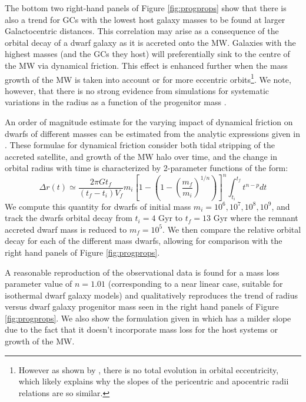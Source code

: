 \documentclass[useAMS,usenatbib]{mn2e}
\begin{document}
The bottom two right-hand panels of Figure \ref{fig:progprops}
show that there is also a
trend for GCs with the lowest host galaxy masses to be found at larger
Galactocentric distances.  This correlation may arise as a consequence of the
orbital decay of a dwarf galaxy as it is accreted onto the MW.  
Galaxies with the highest masses (and the GCs they host) will preferentially
sink to the centre of the MW via dynamical friction.  This effect is enhanced
further when the mass growth of the MW is taken into account or for more
eccentric orbits\footnote{However as shown by \cite{vandenbosch99}, there is no
total evolution in orbital eccentricity, which likely explains why the slopes
of the pericentric and apocentric radii relations are so similar.}.  We note,
however, that there is no strong evidence from simulations for systematic
variations in the radius as a function of the progenitor mass \citep{Wang11}.

An order of magnitude estimate for the varying impact of dynamical friction
on dwarfs of different masses can be estimated from the analytic expressions
given in \cite{Zhao04}.  These formulae for dynamical friction consider both
tidal stripping of the accreted satellite, and growth of the MW halo over time,
and the change in orbital radius with time is characterized by 2-parameter 
functions of the form:
\begin{equation}
\Delta r(t) \simeq \frac{2{\pi}Gt_{f}}{(t_{f}-t_{i})V_{f}}m_{i}[1 - (1 - (\frac{m_{f}}{m_{i}})^{1/n})]^{n}\int^{t_{f}}_{t_{i}}t^{n-p}dt
\end{equation}
We compute this quantity for dwarfs of initial mass $m_{i} = 10^{6},10^{7},10^{8},10^{9}$,
and track the dwarfs orbital decay from $t_{i} = 4$ Gyr to $t_{f} = 13$ Gyr where 
the remnant accreted dwarf mass is reduced to $m_{f} = 10^{5}$.  We then compare
the relative orbital decay for each of the different mass dwarfs, allowing for comparison
with the right hand panels of Figure \ref{fig:progprops}.

A reasonable reproduction of the observational data is found for
a mass loss parameter value of $n = 1.01$ (corresponding to a near linear case, 
suitable for isothermal dwarf galaxy models) and
qualitatively reproduces the trend of radius versus dwarf galaxy progenitor
mass seen in the right hand panels of Figure \ref{fig:progprops}.
  We also show the formulation given in 
\cite{Cote98} which has a milder slope due to the fact that it doesn't 
incorporate mass loss for the host systems or growth of the MW. 
\end{document}
